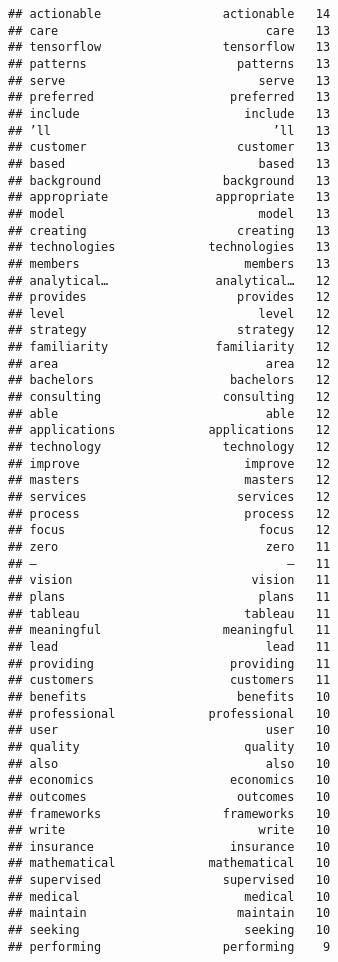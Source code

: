 \documentclass[]{article}
\begin{document}
\begin{verbatim}
## actionable                 actionable   14
## care                             care   13
## tensorflow                 tensorflow   13
## patterns                     patterns   13
## serve                           serve   13
## preferred                   preferred   13
## include                       include   13
## ’ll                               ’ll   13
## customer                     customer   13
## based                           based   13
## background                 background   13
## appropriate               appropriate   13
## model                           model   13
## creating                     creating   13
## technologies             technologies   13
## members                       members   13
## analytical…               analytical…   12
## provides                     provides   12
## level                           level   12
## strategy                     strategy   12
## familiarity               familiarity   12
## area                             area   12
## bachelors                   bachelors   12
## consulting                 consulting   12
## able                             able   12
## applications             applications   12
## technology                 technology   12
## improve                       improve   12
## masters                       masters   12
## services                     services   12
## process                       process   12
## focus                           focus   12
## zero                             zero   11
## –                                   –   11
## vision                         vision   11
## plans                           plans   11
## tableau                       tableau   11
## meaningful                 meaningful   11
## lead                             lead   11
## providing                   providing   11
## customers                   customers   11
## benefits                     benefits   10
## professional             professional   10
## user                             user   10
## quality                       quality   10
## also                             also   10
## economics                   economics   10
## outcomes                     outcomes   10
## frameworks                 frameworks   10
## write                           write   10
## insurance                   insurance   10
## mathematical             mathematical   10
## supervised                 supervised   10
## medical                       medical   10
## maintain                     maintain   10
## seeking                       seeking   10
## performing                 performing    9

\end{verbatim}
\end{document}
